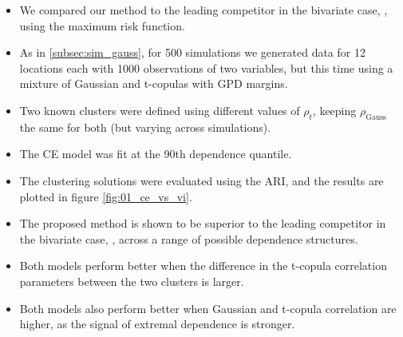 \documentclass{article}
\numberwithin{equation}{section}
\begin{document}
\begin{itemize}
  \item We compared our method to the leading competitor in the bivariate case, \cite{Vignotto2021}, using the maximum risk function.
  \item As in \ref{subsec:sim_gauss}, for 500 simulations we generated data for 12 locations each with 1000 observations of two variables, but this time using a mixture of Gaussian and t-copulas with GPD margins. 
  \item Two known clusters were defined using different values of $\rho_t$, keeping $\rho_{\text{Gauss}}$ the same for both (but varying across simulations).
  \item The CE model was fit at the 90th dependence quantile. 
  \item The clustering solutions were evaluated using the ARI, and the results are plotted in figure \ref{fig:01_ce_vs_vi}.
  \item The proposed method is shown to be superior to the leading competitor in the bivariate case, \cite{Vignotto2021}, across a range of possible dependence structures.
  \item Both models perform better when the difference in the t-copula correlation parameters between the two clusters is larger.
  \item Both models also perform better when Gaussian and t-copula correlation are higher, as the signal of extremal dependence is stronger. 
\end{itemize}
\end{document}
